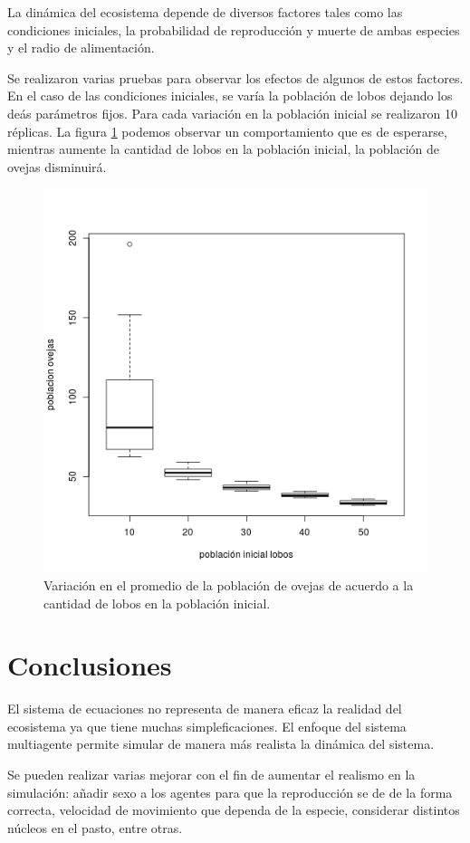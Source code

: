 \documentclass[12pt, twocolumn]{article}
\begin{document}
La din\'amica del ecosistema depende de diversos factores tales como las condiciones iniciales, la probabilidad de reproducci\'on y muerte de ambas especies y el radio de alimentaci\'on.

Se realizaron varias pruebas para observar los efectos de algunos de estos factores. En el caso de las condiciones iniciales, se var\'ia la poblaci\'on de lobos dejando los de\'as par\'ametros fijos. Para cada variaci\'on en la poblaci\'on inicial se realizaron 10 r\'eplicas. La figura \ref{ovejas} podemos observar un comportamiento que es de esperarse, mientras aumente la cantidad de lobos en la poblaci\'on inicial, la poblaci\'on de ovejas disminuir\'a.

\begin{figure}
	\centering
	\includegraphics[scale=0.45]{ovejitas.png}
	\caption{Variaci\'on en el promedio de la poblaci\'on de ovejas de acuerdo a la cantidad de lobos en la poblaci\'on inicial.}
	\label{ovejas}
\end{figure}
 
\section{Conclusiones}
\label{sec:con}

El sistema de ecuaciones no representa de manera eficaz la realidad del ecosistema ya que tiene muchas simpleficaciones. El enfoque del sistema multiagente permite simular de manera m\'as realista la din\'amica del sistema.

Se pueden realizar varias mejorar con el fin de aumentar el realismo en la simulaci\'on: a\~nadir sexo a los agentes para que la reproducci\'on se de de la forma correcta, velocidad de movimiento que dependa de la especie, considerar distintos n\'ucleos en el pasto, entre otras.



\nocite{*}
\end{document}
